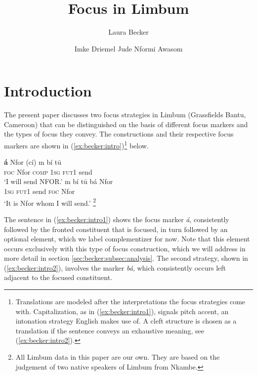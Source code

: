 \documentclass[output=paper,
modfonts
]{langscibook}
\title{Focus in Limbum}
\author{%
Laura Becker\affiliation{Leipzig University}\and 
 Imke Driemel\affiliation{Leipzig University}\lastand 
 Jude Nformi Awasom\affiliation{Leipzig University}
}
\begin{document}
\maketitle

\section{Introduction} 

The present paper discusses two focus strategies in Limbum (Grassfields Bantu, Cameroon) that can be distinguished on the basis of different focus markers and the types of focus they convey. The constructions and their respective focus markers are shown in (\ref{ex:becker:intro})\footnote{Translations are modeled after the interpretations the focus strategies come with. Capitalization, as in (\ref{ex:becker:intro1}), signals pitch accent, an intonation strategy English makes use of. A cleft structure is chosen as a translation if the sentence conveys an exhaustive meaning, see (\ref{ex:becker:intro2}).} below.

\ea \label{ex:becker:intro}
\ea \label{ex:becker:intro1}
\gll \textbf{á}  Nfor (cí) m bí t\=u \\
\textsc{foc} Nfor \textsc{comp} \textsc{1sg} \textsc{fut1} send \\
\glt `I will send NFOR.'
\ex \label{ex:becker:intro2}
\gll m bí t\=u bá Nfor\\
\textsc{1sg} \textsc{fut1} send \textsc{foc} Nfor\\
\glt `It is Nfor whom I will send.' \footnote{All Limbum data in this paper are our own. They are based on the judgement of two native speakers of Limbum from Nkambe.}
\z
\z 


\noindent
The sentence in (\ref{ex:becker:intro1}) shows the focus marker \textit{á}, consistently followed by the fronted constituent that is focused, in turn followed by an optional element, which we label complementizer for now. Note that this element occurs exclusively with this type of focus construction, which we will address in more detail in section \ref{sec:becker:subsec:analysis}. The second strategy, shown in (\ref{ex:becker:intro2}), involves the marker \textit{bá}, which consistently occurs left adjacent to the focused constituent.
 
\end{document}
